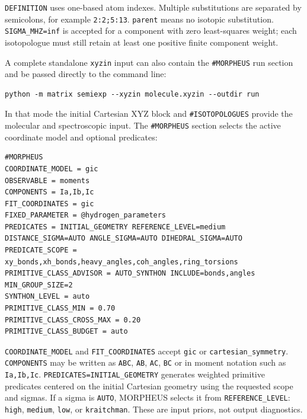 \documentclass[11pt]{article}
\newcommand{\xyzin}{\texttt{xyzin}}
\begin{document}
\noindent
\texttt{DEFINITION} uses one-based atom indexes.  Multiple substitutions are
separated by semicolons, for example \texttt{2:2;5:13}.  \texttt{parent} means
no isotopic substitution.  \texttt{SIGMA\_MHZ=inf} is accepted for a component
with zero least-squares weight; each isotopologue must still retain at least
one positive finite component weight.

A complete standalone \xyzin{} input can also contain the \texttt{\#MORPHEUS}
run section and be passed directly to the command line:

\begin{lstlisting}[style=oracle]
python -m matrix semiexp --xyzin molecule.xyzin --outdir run
\end{lstlisting}

\noindent
In that mode the initial Cartesian XYZ block and \texttt{\#ISOTOPOLOGUES}
provide the molecular and spectroscopic input.  The \texttt{\#MORPHEUS}
section selects the active coordinate model and optional predicates:

\begin{lstlisting}[style=oracle]
#MORPHEUS
COORDINATE_MODEL = gic
OBSERVABLE = moments
COMPONENTS = Ia,Ib,Ic
FIT_COORDINATES = gic
FIXED_PARAMETER = @hydrogen_parameters
PREDICATES = INITIAL_GEOMETRY REFERENCE_LEVEL=medium DISTANCE_SIGMA=AUTO ANGLE_SIGMA=AUTO DIHEDRAL_SIGMA=AUTO
PREDICATE_SCOPE = xy_bonds,xh_bonds,heavy_angles,coh_angles,ring_torsions
PRIMITIVE_CLASS_ADVISOR = AUTO_SYNTHON INCLUDE=bonds,angles MIN_GROUP_SIZE=2
SYNTHON_LEVEL = auto
PRIMITIVE_CLASS_MIN = 0.70
PRIMITIVE_CLASS_CROSS_MAX = 0.20
PRIMITIVE_CLASS_BUDGET = auto
\end{lstlisting}

\noindent
\texttt{COORDINATE\_MODEL} and \texttt{FIT\_COORDINATES} accept
\texttt{gic} or \texttt{cartesian\_symmetry}.  \texttt{COMPONENTS} may be
written as \texttt{ABC}, \texttt{AB}, \texttt{AC}, \texttt{BC} or in moment
notation such as \texttt{Ia,Ib,Ic}.  \texttt{PREDICATES=INITIAL\_GEOMETRY}
generates weighted primitive predicates centered on the initial Cartesian
geometry using the requested scope and sigmas.  If a sigma is \texttt{AUTO},
MORPHEUS selects it from \texttt{REFERENCE\_LEVEL}: \texttt{high},
\texttt{medium}, \texttt{low}, or \texttt{kraitchman}.  These are input priors,
not output diagnostics.
\end{document}
